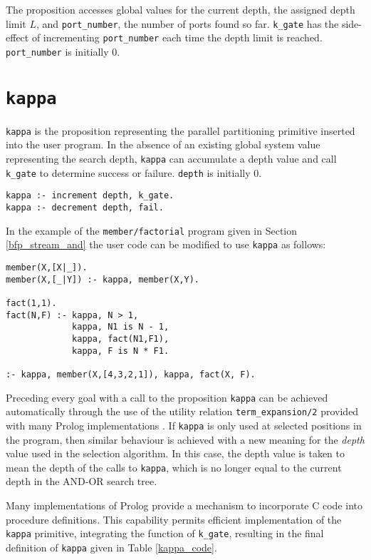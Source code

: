 The proposition accesses global values for the current depth, the
assigned depth limit $L$, and \texttt{port\_{}number},
the number of ports found so far.  \texttt{k\_{}gate} has the side-effect
of incrementing \texttt{port\_{}number} each time the depth limit is reached.
\texttt{port\_{}number} is initially 0.

\section{\texttt{kappa}} %

\texttt{kappa} is the proposition representing the parallel partitioning
primitive inserted into the user program.  In the absence of an existing
global system value representing the search depth, \texttt{kappa} can
accumulate a depth value and call \texttt{k\_{}gate} to determine
success or failure.  \texttt{depth} is initially 0.
\begin{verbatim}
kappa :- increment depth, k_gate.
kappa :- decrement depth, fail.
\end{verbatim}
In the example of the \texttt{member/factorial} program given in Section
\ref{bfp_stream_and}
the user code can be modified to use \texttt{kappa} as follows:
\begin{verbatim}
member(X,[X|_]).
member(X,[_|Y]) :- kappa, member(X,Y).

fact(1,1).
fact(N,F) :- kappa, N > 1,
             kappa, N1 is N - 1,
             kappa, fact(N1,F1),
             kappa, F is N * F1.
             
:- kappa, member(X,[4,3,2,1]), kappa, fact(X, F).
\end{verbatim}
Preceding every goal with a call to the proposition \texttt{kappa} can
be achieved automatically through the use of the utility relation
\texttt{term\_{}expansion/2} provided with many Prolog implementations
\cite{BBP+94}.  If \texttt{kappa} is only used at selected positions
in the program, then similar behaviour is achieved with a new
meaning for the \textit{depth} value used in the selection 
algorithm.  In this case, the depth value is taken to mean the depth
of the calls to \texttt{kappa}, which is no longer equal to the
current depth in the AND-OR search tree.

Many implementations of Prolog provide a mechanism to incorporate C
code into procedure definitions.  This capability permits efficient
implementation of the \texttt{kappa} primitive, integrating the
function of \texttt{k\_{}gate}, resulting in the final definition
of \texttt{kappa} given in Table \ref{kappa_code}.


